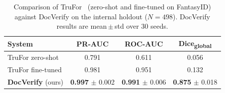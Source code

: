 \begin{table}[!t]
\centering
\caption{Comparison of TruFor~\citep{trufor2023} (zero-shot and fine-tuned on
FantasyID) against DocVerify on the internal holdout ($N=498$).
DocVerify results are mean\,$\pm$\,std over 30 seeds.}
\label{tab:trufor_comparison}
\begin{tabular}{lccc}
\toprule
System & PR-AUC & ROC-AUC & Dice\textsubscript{global} \\
\midrule
TruFor zero-shot~\citep{trufor2023} & 0.791 & 0.611 & 0.056 \\
TruFor fine-tuned & 0.981 & 0.951 & 0.132 \\
\textbf{DocVerify} (ours) & \textbf{0.997} $\pm$ 0.002 & \textbf{0.991} $\pm$ 0.006 & \textbf{0.875} $\pm$ 0.018 \\
\bottomrule
\end{tabular}
\end{table}
